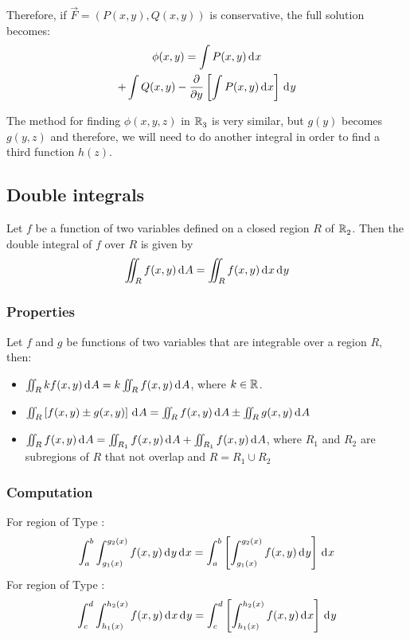 \documentclass[10pt, twocolumn]{article}
\theoremstyle{remark}
\begin{document}
Therefore, if \(\vec{F} = \left( P(x, y), Q(x, y) \right)\) is conservative, the full solution becomes:
\begin{multline*}
  \phi(x,y) = \int{P(x,y)\,\mathrm{d}^{} x} \\
  + \int{Q(x,y) - \frac{\partial }{\partial y}\left[ \int{P(x,y)\,\mathrm{d}^{} x} \right]\,\mathrm{d}^{} y}
\end{multline*}

The method for finding \(\phi(x, y, z)\) in \(\mathbb{R}_{3}^{}\) is very similar, but \(g(y)\) becomes \(g(y, z)\) and therefore, we will need to do another integral in order to find a third function \(h(z)\).

\subsection{Double integrals}
Let \(f\) be a function of two variables defined on a closed region \(R\) of \(\mathbb{R}_{2}^{}\).
Then the double integral of \(f\) over \(R\) is given by
\[
  \iint_R {f(x, y) \,\mathrm{d}^{} A} = \iint_R {f(x, y) \,\mathrm{d}^{} x \,\mathrm{d}^{} y}
\]

\subsubsection*{Properties}
Let \(f\) and \(g\) be functions of two variables that are integrable over a region \(R\), then:
\begin{itemize}
  \item \(\iint_R {kf(x, y) \,\mathrm{d}^{} A} = k\iint_R {f(x, y) \,\mathrm{d}^{} A}\), where \(k \in \mathbb{R}_{}^{}\).
  \item \(\iint_R {\left[ f(x, y) \pm g(x, y) \right] \,\mathrm{d}^{} A} = \iint_R {f(x, y) \,\mathrm{d}^{} A} \pm \iint_R {g(x, y) \,\mathrm{d}^{} A}\)
  \item \(\iint_R {f(x, y) \,\mathrm{d}^{} A} = \iint_{R_1 }{f(x, y) \,\mathrm{d}^{} A} + \iint_{R_1 }{f(x, y) \,\mathrm{d}^{} A}\), where \(R_1 \) and \(R_2 \) are subregions of \(R\) that not overlap and \(R = R_1 \cup R_2 \)
\end{itemize}

\subsubsection*{Computation}
For region of Type :
\[
  \int_a ^b {\int_{g_1 (x)}^{g_2 (x)}{f(x, y) \,\mathrm{d}^{} y}\,\mathrm{d}^{} x} = \int_a ^b {\left[ \int_{g_1 (x)}^{g_2 (x)}{f(x, y) \,\mathrm{d}^{} y} \right]\,\mathrm{d}^{} x}
\]
For region of Type :
\[
  \int_c ^d {\int_{h_1 (x)}^{h_2 (x)}{f(x, y) \,\mathrm{d}^{} x}\,\mathrm{d}^{} y} = \int_c ^d {\left[ \int_{h_1 (x)}^{h_2 (x)}{f(x, y) \,\mathrm{d}^{} x} \right]\,\mathrm{d}^{} y}
\]
\end{document}
